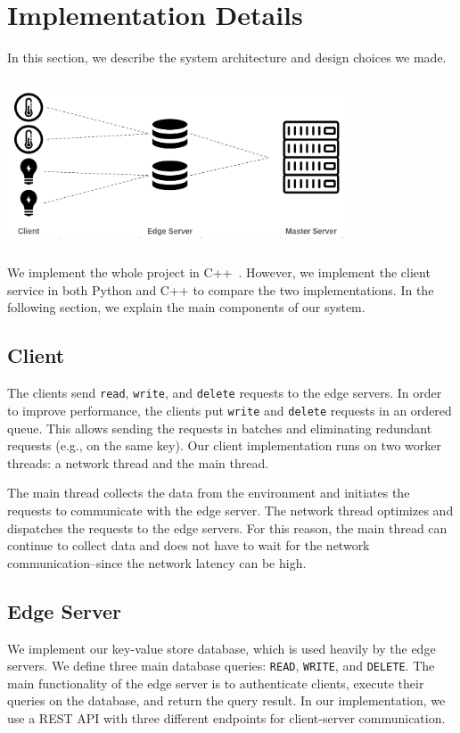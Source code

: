 
\section{Implementation Details}
\label{sec:Solution}
In this section, we describe the system architecture and design choices we made. 

\begin{center}
 \includegraphics[width=10cm, height=5cm]{figures/architecture.png}
\end{center}

We implement the whole project in C++~\cite{prj_git}. However, we implement the client service in both Python and C++ to compare the two implementations. In the following section, we explain the main components of our system. 
\subsection{Client}
The clients send \texttt{read}, \texttt{write}, and \texttt{delete} requests to the edge servers. In order to improve performance, the clients put \texttt{write} and \texttt{delete} requests in an ordered queue. This allows sending the requests in batches and eliminating redundant requests (e.g., on the same key). Our client implementation runs on two worker threads: a network thread and the main thread.

The main thread collects the data from the environment and initiates the requests to communicate with the edge server. The network thread optimizes and dispatches the requests to the edge servers. For this reason, the main thread can continue to collect data and does not have to wait for the network communication--since the network latency can be high.

\subsection{Edge Server}
We implement our key-value store database, which is used heavily by the edge servers. We define three main database queries: \texttt{READ}, \texttt{WRITE}, and \texttt{DELETE}. The main functionality of the edge server is to authenticate clients, execute their queries on the database, and return the query result. In our implementation, we use a REST API with three different endpoints for client-server communication.


